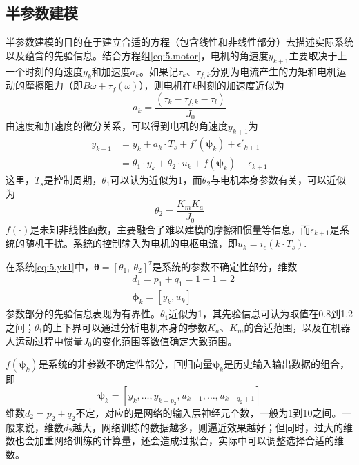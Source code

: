\subsection{半参数建模}\label{5.2.1}
半参数建模的目的在于建立合适的方程（包含线性和非线性部分）去描述实际系统以及蕴含的先验信息。结合方程组\eqref{eq:5.motor}，电机的角速度$y_{k+1}$主要取决于上一个时刻的角速度$y_{k}$和加速度$a_{k}$。如果记$\tau_{k}$、$\tau_{f,k}$分别为电流产生的力矩和电机运动的摩擦阻力（即$B \omega + \tau_{f}(\omega)$），则电机在$k$时刻的加速度近似为
$$a_{k}=\frac{(\tau_{k}-\tau_{f,k}-\tau_{l})}{J_{0}}$$
由速度和加速度的微分关系，可以得到电机的角速度$y_{k+1}$为
\begin{equation}\label{eq:5.yk1}
\begin{split}
y_{k+1}&=y_{k}+a_{k}\cdot T_{s}+f'(\bm{\psi}_{k})+\epsilon'_{k+1}\\
&=\theta_{1}\cdot y_{k}+\theta_{2}\cdot u_{k}+f(\bm{\psi}_{k})+\epsilon_{k+1}
\end{split}
\end{equation}
这里，$T_{s}$是控制周期，$\theta_{1}$可以认为近似为1，而$\theta_{2}$与电机本身参数有关，可以近似为
$$\theta_{2}=\frac{K_{m}K_{a}}{J_{0}}$$
$f(\cdot)$是未知非线性函数，主要融合了难以建模的摩擦和惯量等信息，而$\epsilon_{k+1}$是系统的随机干扰。系统的控制输入为电机的电枢电流，即$u_{k}=i_{c}(k\cdot T_{s})$.

在系统\eqref{eq:5.yk1}中，$\bm{\theta}=[\theta_{1},\ \theta_{2}]^{\tau}$是系统的参数不确定性部分，维数
\begin{equation}%
\begin{array}{cc}
&d_{1}=p_{1}+q_{1}=1+1=2\\
&\bm{\phi}_{k}=[y_{k},u_{k}]
\end{array}
\end{equation}
参数部分的先验信息表现为有界性。$\theta_{1}$近似为1，其先验信息可认为取值在0.8到1.2之间；$\theta_{1}$的上下界可以通过分析电机本身的参数$K_{a}$、$K_{m}$的合适范围，以及在机器人运动过程中惯量$J_{0}$的变化范围等数值确定大致范围。

$f(\bm{\psi}_{k})$是系统的非参数不确定性部分，回归向量$\bm{\psi}_{k}$是历史输入输出数据的组合，即
$$\bm{\psi}_{k}=[y_{k},\ldots,y_{k-p_{2}},u_{k-1},\dots,u_{k-q_{2}+1}]$$
维数$d_{2}=p_{2}+q_{2}$不定，对应的是网络的输入层神经元个数，一般为1到10之间。一般来说，维数$d_{2}$越大，网络训练的数据越多，则逼近效果越好；但同时，过大的维数也会加重网络训练的计算量，还会造成过拟合，实际中可以调整选择合适的维数。

